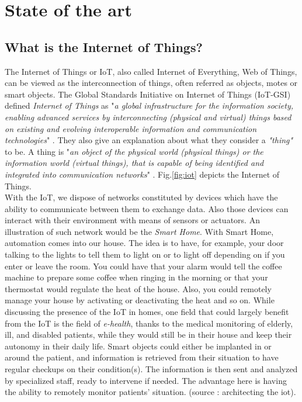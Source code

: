 \part{State of the art} \label{part:state_art}

\chapter{What is the Internet of Things?}

The Internet of Things or IoT, also called Internet of Everything, Web of Things, can be viewed as the interconnection of things, often referred as objects, motes or smart objects. The Global Standards Initiative on Internet of Things (IoT-GSI) defined \textit{Internet of Things} as "\textit{a global infrastructure for the information society, enabling advanced services by interconnecting (physical and virtual) things based on existing and evolving interoperable information and communication technologies}" \cite{ituitu}. They also give an explanation about what they consider a \textit{"thing"} to be. A thing is "\textit{an object of the physical world (physical things) or the information world (virtual things), that is capable of being identified and integrated into communication networks}" \cite{ituitu}. Fig.\ref{fig:iot} depicts the Internet of Things.\\

With the IoT, we dispose of networks constituted by devices which have the ability to communicate between them to exchange data. Also those devices can interact with their environment with means of sensors or actuators. An illustration of such network would be the \textit{Smart Home}. With Smart Home, automation comes into our house. The idea is to have, for example, your door talking to the lights to tell them to light on or to light off depending on if you enter or leave the room. You could have that your alarm would tell the coffee machine to prepare some coffee when ringing in the morning or that your thermostat would regulate the heat of the house. Also, you could remotely manage your house by activating or deactivating the heat and so on. While discussing the presence of the IoT in homes, one field that could largely benefit from the IoT is the field of \textit{e-health}, thanks to the medical monitoring of elderly, ill, and disabled patients, while they would still be in their house and keep their autonomy in their daily life. Smart objects could either be implanted in or around the patient, and information is retrieved from their situation to have regular checkups on their condition(s). The information is then sent and analyzed by specialized staff, ready to intervene if needed. The advantage here is having the ability to remotely monitor patients' situation. (source : architecting the iot).\\

